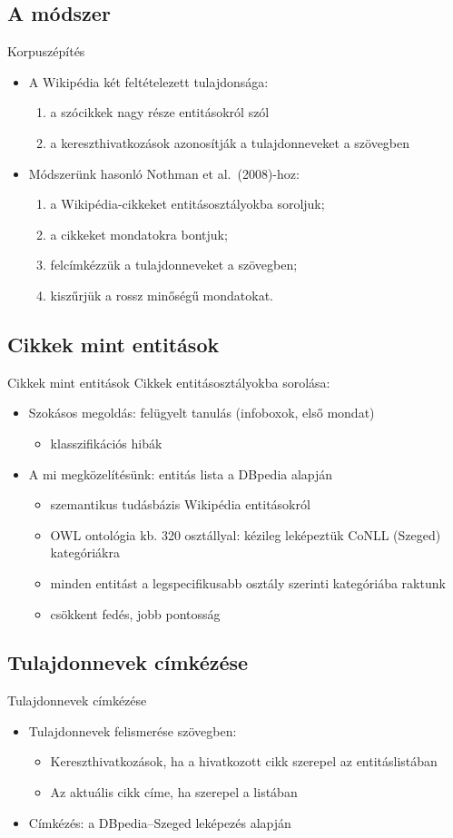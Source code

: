 \documentclass[utf8x,t]{beamer}
\newcommand{\vitem}{\item \vspace{4pt}}
\begin{document}
\subsection*{A módszer}

\begin{frame}{Korpuszépítés}
  \bigskip
  \begin{itemize}
  \vitem A Wikipédia két feltételezett tulajdonsága:
    \begin{enumerate}
    \vitem a szócikkek nagy része entitásokról szól
    \vitem a kereszthivatkozások azonosítják a tulajdonneveket a szövegben
    \end{enumerate}
  \vitem Módszerünk hasonló Nothman et al.~(2008)-hoz:
    \begin{enumerate}
    \vitem a Wikipédia-cikkeket entitásosztályokba soroljuk;
    \vitem a cikkeket mondatokra bontjuk;
    \vitem felcímkézzük a tulajdonneveket a szövegben;
    \vitem kiszűrjük a rossz minőségű mondatokat.
    \end{enumerate}
  \end{itemize}
\end{frame}

\subsection{Cikkek mint entitások}
\begin{frame}{Cikkek mint entitások}
  \bigskip
  Cikkek entitásosztályokba sorolása:
  \smallskip
  \begin{itemize}
  \vitem Szokásos megoldás: felügyelt tanulás (infoboxok, első mondat)
    \begin{itemize}
    \vitem klasszifikációs hibák
    \end{itemize}
  \vitem A mi megközelítésünk: entitás lista a DBpedia alapján
    \begin{itemize}
    \vitem szemantikus tudásbázis Wikipédia entitásokról
    \vitem OWL ontológia kb. 320 osztállyal: kézileg leképeztük CoNLL (Szeged) kategóriákra
    \vitem minden entitást a legspecifikusabb osztály szerinti kategóriába raktunk
    \vitem csökkent fedés, jobb pontosság
    \end{itemize}
  \end{itemize}
\end{frame}

\subsection{Tulajdonnevek címkézése}
\begin{frame}{Tulajdonnevek címkézése}
  \bigskip
  \begin{itemize}
  \vitem Tulajdonnevek felismerése szövegben:
    \begin{itemize}
    \vitem Kereszthivatkozások, ha a hivatkozott cikk szerepel az entitáslistában
    \vitem Az aktuális cikk címe, ha szerepel a listában
    \end{itemize}
  \vitem Címkézés: a DBpedia--Szeged leképezés alapján
  \end{itemize}
\end{frame}
\end{document}
